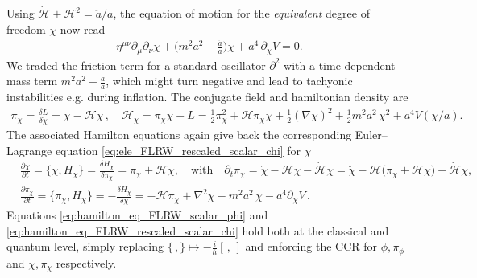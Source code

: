 \documentclass[../QFT_main.tex]{subfiles}
\begin{document}
Using $\dot{\mathcal{H}}+\mathcal{H}^2 = \ddot{a}/a$, the equation of motion for the \emph{equivalent} degree of freedom $\chi$ now read
\begin{align}\label{eq:ele_FLRW_rescaled_scalar_chi}
    \eta^{\mu\nu} \partial_\mu \partial_\nu \chi + \big(m^2 a^2 - \tfrac{\ddot{a}}{a}\big) \chi + a^4 \,\partial_\chi\! V = 0.
\end{align}
We traded the friction term for a standard oscillator $\partial^2$ with a time-dependent mass term $m^2 a^2 - \tfrac{\ddot{a}}{a}$,  which might turn negative and lead to tachyonic instabilities e.g. during inflation.
The conjugate field and hamiltonian density are
\begin{align}
    \pi_\chi = \frac{\delta L}{\delta \dot{\chi}} = \dot{\chi} - \mathcal{H} \chi\,, \quad 
    \mathcal{H}_\chi = \pi_\chi \dot{\chi} - L = \tfrac{1}{2} \pi_\chi^2 +\mathcal{H}\pi_\chi\chi + \tfrac{1}{2} (\nabla \chi)^2 + \tfrac{1}{2}m^2 a^2\,\chi^2 + a^4 V(\chi/a).
\end{align}
The associated Hamilton equations again give back the corresponding Euler--Lagrange equation \eqref{eq:ele_FLRW_rescaled_scalar_chi} for $\chi$
\begin{align}\label{eq:hamilton_eq_FLRW_rescaled_scalar_chi}
    &\frac{\partial \chi}{\partial t} = \{\chi, H_\chi\}= \frac{\delta H_\chi}{\delta \pi_\chi} = \pi_\chi + \mathcal{H} \chi, \quad \text{with}\quad \partial_t\pi_\chi = \ddot{\chi} - \mathcal{H} \dot{\chi} - \dot{\mathcal{H}} \chi = \ddot{\chi}-\mathcal{H}\big(\pi_\chi+ \mathcal{H} \chi\big) - \dot{\mathcal{H}} \chi,\\
    &\frac{\partial \pi_\chi}{\partial t} = \{\pi_\chi, H_\chi\} = -\frac{\delta H_\chi}{\delta \chi} = -\mathcal{H}\pi_\chi + \nabla^2 \chi - m^2 a^2\,\chi - a^4 \partial_\chi V \,.
\end{align}
Equations \eqref{eq:hamilton_eq_FLRW_scalar_phi} and \eqref{eq:hamilton_eq_FLRW_rescaled_scalar_chi} hold both at the classical and quantum level, simply replacing $\{\,,\}\mapsto -\tfrac{i}{\hbar}[\,,\,]$ and enforcing the CCR for $\phi,\pi_\phi$ and $\chi,\pi_\chi$ respectively.
\end{document}
